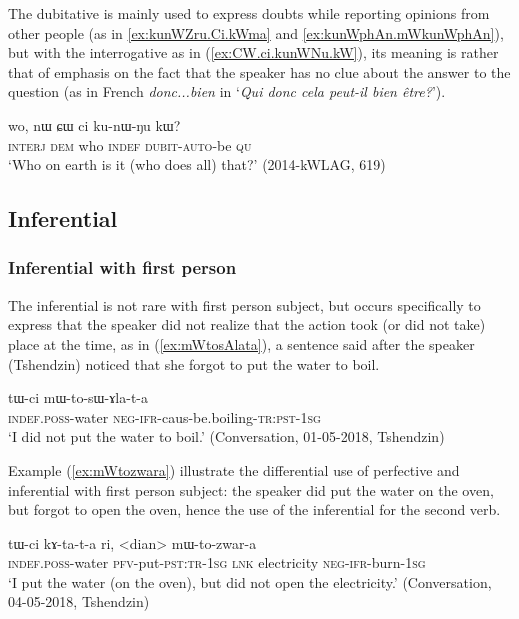 The dubitative is mainly used to express doubts while reporting opinions from other people (as in \ref{ex:kunWZru.Ci.kWma} and \ref{ex:kunWphAn.mWkunWphAn}), but with the interrogative  as in (\ref{ex:CW.ci.kunWNu.kW}), its meaning is rather that of emphasis on the fact that the speaker has no clue about the answer to the question (as in French \textit{donc...bien} in `\textit{Qui donc cela peut-il bien être?}').

  \begin{exe}
\ex \label{ex:CW.ci.kunWNu.kW}
 \gll wo, nɯ ɕɯ ci ku-nɯ-ŋu kɯ?  \\
 \textsc{interj} \textsc{dem} who \textsc{indef} \textsc{dubit}-\textsc{auto}-be \textsc{qu} \\
\glt `Who on earth is it (who does all) that?' (2014-kWLAG, 619)
 \end{exe}
 
\subsection{Inferential} 

\subsubsection{Inferential with first person}
The inferential is not rare with first person subject, but occurs specifically to express that the speaker did not realize that the action took (or did not take) place at the time, as in (\ref{ex:mWtosAlata}), a sentence said after the speaker (Tshendzin) noticed that she forgot to put the water to boil.

\begin{exe}
\ex \label{ex:mWtosAlata}
\gll tɯ-ci mɯ-to-sɯ-ɤla-t-a \\
\textsc{indef}.\textsc{poss}-water \textsc{neg}-\textsc{ifr}-caus-be.boiling-\textsc{tr}:\textsc{pst}-\textsc{1sg} \\
\glt `I did not put the water to boil.' (Conversation, 01-05-2018, Tshendzin)
\end{exe}


Example (\ref{ex:mWtozwara}) illustrate the differential use of perfective and inferential with first person subject: the speaker did put the water on the oven, but forgot to open the oven, hence the use of the inferential for the second verb.

\begin{exe}
\ex \label{ex:mWtozwara}
\gll tɯ-ci kɤ-ta-t-a ri, <dian> mɯ-to-zwar-a \\
\textsc{indef}.\textsc{poss}-water \textsc{pfv}-put-\textsc{pst}:\textsc{tr}-\textsc{1sg} \textsc{lnk} electricity \textsc{neg}-\textsc{ifr}-burn-\textsc{1sg} \\
\glt `I put the water (on the oven), but did not open the electricity.' (Conversation, 04-05-2018, Tshendzin)
\end{exe}

